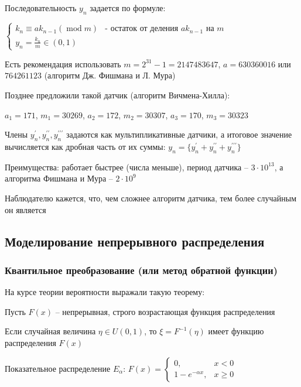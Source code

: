 \begin{enumerate}[label*=\Roman*. ]
    Последовательность $y_n$ задается по формуле:

    $\begin{cases}
        k_n \equiv a k_{n - 1} (\operatorname{mod} m) & \text{- остаток от деления }ak_{n - 1}\text{ на }m \\
        y_n = \frac{k_n}{m} \in (0, 1)
    \end{cases}$

    Есть рекомендация использовать $m = 2^{31} - 1 = 2147483647$, $a = 630360016$ или $764261123$ (алгоритм Дж. Фишмана и Л. Мура)

    \mediumvspace

    Позднее предложили такой датчик (алгоритм Вичмена-Хилла):

    $a_1 = 171$, $m_1 = 30269$, $a_2 = 172$, $m_2 = 30307$, $a_3 = 170$, $m_3 = 30323$ 

    Члены $y_n^\prime, y_n^{\prime\prime}, y_n^{\prime\prime\prime}$ задаются как мультипликативные датчики, а итоговое значение вычисляется как дробная часть от их суммы: $y_n = \{y_n^\prime + y_n^{\prime\prime} + y_n^{\prime\prime\prime}\}$

    Преимущества: работает быстрее (числа меньше), период датчика -- $3 \cdot 10^{13}$, а алгоритма Фишмана и Мура -- $2 \cdot 10^9$

    Наблюдателю кажется, что, чем сложнее алгоритм датчика, тем более случайным он является

\end{enumerate}

\subsection{Моделирование непрерывного распределения}

\subsubsection{Квантильное преобразование (или метод обратной функции)}

На курсе теории вероятности выражали такую теорему:

\begin{MyTheorem}
    \Ths Пусть $F(x)$ -- непрерывная, строго возрастающая функция распределения

    Если случайная величина $\eta \in U(0, 1)$, то $\xi = F^{-1}(\eta)$ имеет функцию распределения $F(x)$
\end{MyTheorem}

\Ex Показательное распределение $E_\alpha$: $F(x) = \begin{cases}0, & x < 0 \\ 1 - e^{-\alpha x}, & x \geq 0\end{cases}$

